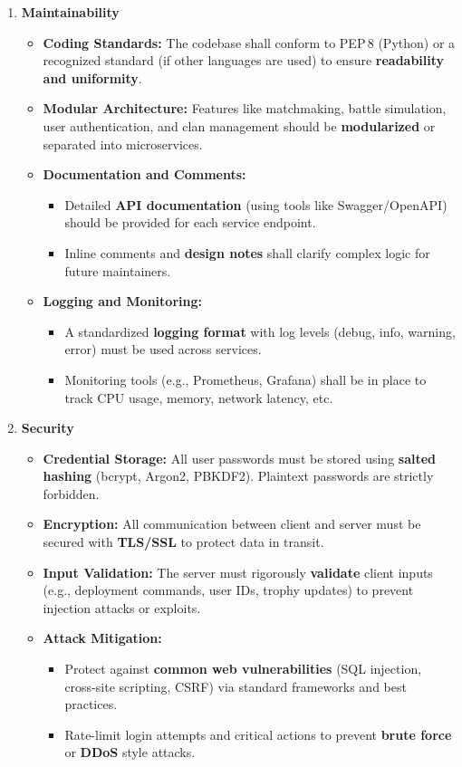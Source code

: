 \documentclass{article}
\begin{document}
\begin{enumerate}[label=\textbf{NFR\arabic*.}]
\item \textbf{Maintainability}
\begin{itemize}
    \item \textbf{Coding Standards:} The codebase shall conform to PEP\,8 (Python) or a recognized standard (if other languages are used) to ensure \textbf{readability and uniformity}.
    \item \textbf{Modular Architecture:} Features like matchmaking, battle simulation, user authentication, and clan management should be \textbf{modularized} or separated into microservices.
    \item \textbf{Documentation and Comments:}
    \begin{itemize}
        \item Detailed \textbf{API documentation} (using tools like Swagger/OpenAPI) should be provided for each service endpoint.
        \item Inline comments and \textbf{design notes} shall clarify complex logic for future maintainers.
    \end{itemize}
    \item \textbf{Logging and Monitoring:}
    \begin{itemize}
        \item A standardized \textbf{logging format} with log levels (debug, info, warning, error) must be used across services.
        \item Monitoring tools (e.g., Prometheus, Grafana) shall be in place to track CPU usage, memory, network latency, etc.
    \end{itemize}
\end{itemize}

\item \textbf{Security}
\begin{itemize}
    \item \textbf{Credential Storage:} All user passwords must be stored using \textbf{salted hashing} (bcrypt, Argon2, PBKDF2). Plaintext passwords are strictly forbidden.
    \item \textbf{Encryption:} All communication between client and server must be secured with \textbf{TLS/SSL} to protect data in transit.
    \item \textbf{Input Validation:} The server must rigorously \textbf{validate} client inputs (e.g., deployment commands, user IDs, trophy updates) to prevent injection attacks or exploits.
    \item \textbf{Attack Mitigation:}
    \begin{itemize}
        \item Protect against \textbf{common web vulnerabilities} (SQL injection, cross-site scripting, CSRF) via standard frameworks and best practices.
        \item Rate-limit login attempts and critical actions to prevent \textbf{brute force} or \textbf{DDoS} style attacks.
    \end{itemize}
\end{itemize}

\end{enumerate}
\end{document}
